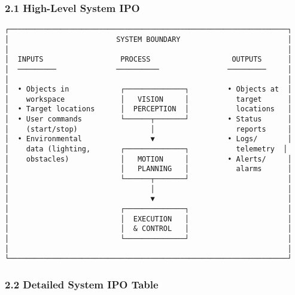 \documentclass[
]{article}
\begin{document}
\hypertarget{high-level-system-ipo}{%
\subsubsection{2.1 High-Level System IPO}\label{high-level-system-ipo}}

\begin{verbatim}
┌─────────────────────────────────────────────────────────────────┐
│                         SYSTEM BOUNDARY                         │
│                                                                 │
│  INPUTS                  PROCESS                   OUTPUTS      │
│  ─────────              ──────────                ─────────     │
│                                                                 │
│  • Objects in            ┌──────────────┐         • Objects at  │
│    workspace             │   VISION     │           target      │
│  • Target locations      │  PERCEPTION  │           locations   │
│  • User commands         └──────┬───────┘         • Status      │
│    (start/stop)                 │                   reports     │
│  • Environmental                ▼                 • Logs/       │
│    data (lighting,       ┌──────────────┐           telemetry  │
│    obstacles)            │   MOTION     │         • Alerts/     │
│                          │   PLANNING   │           alarms      │
│                          └──────┬───────┘                       │
│                                 │                               │
│                                 ▼                               │
│                          ┌──────────────┐                       │
│                          │  EXECUTION   │                       │
│                          │  & CONTROL   │                       │
│                          └──────────────┘                       │
│                                                                 │
└─────────────────────────────────────────────────────────────────┘
\end{verbatim}

\hypertarget{detailed-system-ipo-table}{%
\subsubsection{2.2 Detailed System IPO
Table}\label{detailed-system-ipo-table}}
\end{document}
